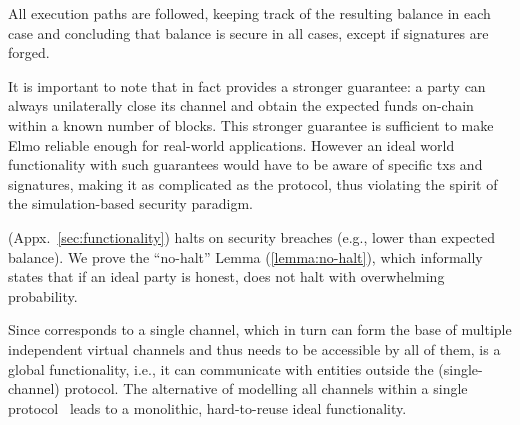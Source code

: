 \begin{proofsketch}
  All execution paths are followed, keeping track of the
  resulting balance in each case and concluding that balance is
  secure in all cases, except if signatures are forged.
\end{proofsketch}
    It is important to note that in fact \pchan provides a stronger guarantee:
  a party can always unilaterally close its channel
  and obtain the expected funds on-chain within a known number of blocks.
  This stronger guarantee is sufficient to make Elmo reliable
  enough for real-world applications. However an ideal world
  functionality with such guarantees would have to be aware of specific
  txs and signatures, making it as complicated
  as the protocol, thus violating the spirit of the simulation-based security
  paradigm.

  \fchan (Appx.~\ref{sec:functionality}) halts on security breaches (e.g., lower
  than expected balance).
  We prove the ``no-halt'' Lemma (\ref{lemma:no-halt}), which informally states
  that if an ideal party is honest, \fchan does not halt with overwhelming
  probability.

  Since \fchan corresponds to a single channel, which in turn can form the base
  of multiple independent virtual channels and thus needs to be accessible by
  all of them, \fchan is a global functionality, i.e., it can communicate with
  entities outside the (single-channel) protocol. The alternative of modelling
  all channels within a single protocol~\cite{DBLP:conf/csfw/KiayiasL20} leads
  to a monolithic, hard-to-reuse ideal functionality.

